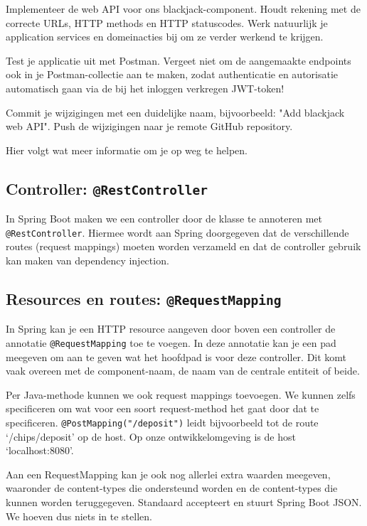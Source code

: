 Implementeer de web API voor ons blackjack-component. Houdt rekening met 
de correcte URLs, HTTP methods en HTTP statuscodes. Werk natuurlijk 
je application services en domeinacties bij om ze verder werkend te krijgen.

Test je applicatie uit met Postman.
Vergeet niet om de aangemaakte endpoints ook 
in je Postman-collectie aan te maken, 
zodat authenticatie en autorisatie automatisch 
gaan via de bij het inloggen verkregen JWT-token!

Commit je wijzigingen met een duidelijke naam, 
bijvoorbeeld: "Add blackjack web API". 
Push de wijzigingen naar je remote GitHub repository.

Hier volgt wat meer informatie om je op weg te helpen.

\subsection{Controller: \texttt{@RestController}}
In Spring Boot maken we een controller door de klasse te annoteren 
met \texttt{@RestController}. Hiermee wordt aan Spring doorgegeven
dat de verschillende routes (request mappings) moeten worden verzameld
en dat de controller gebruik kan maken van dependency injection.

\subsection{Resources en routes: \texttt{@RequestMapping}}
In Spring kan je een HTTP resource aangeven door boven een controller
de annotatie \texttt{@RequestMapping} toe te voegen. In deze annotatie 
kan je een pad meegeven om aan te geven wat het hoofdpad is voor deze controller.
Dit komt vaak overeen met de component-naam, de naam van de centrale entiteit of beide.

Per Java-methode kunnen we ook request mappings toevoegen. We kunnen zelfs specificeren
om wat voor een soort request-method het gaat door dat te specificeren.
\texttt{@PostMapping("/deposit")} leidt bijvoorbeeld tot de route `/chips/deposit' op 
de host. Op onze ontwikkelomgeving is de host `localhost:8080'.

Aan een RequestMapping kan je ook nog allerlei extra waarden meegeven, waaronder 
de content-types die ondersteund worden en de content-types die kunnen worden teruggegeven.
Standaard accepteert en stuurt Spring Boot JSON. We hoeven dus niets in te stellen.

